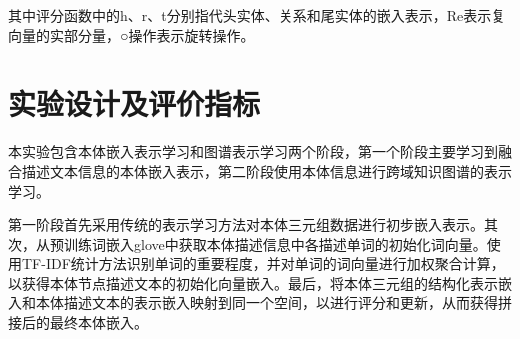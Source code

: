 
其中评分函数中的h、r、t分别指代头实体、关系和尾实体的嵌入表示，Re表示复向量的实部分量，○操作表示旋转操作。

\section{实验设计及评价指标}
本实验包含本体嵌入表示学习和图谱表示学习两个阶段，第一个阶段主要学习到融合描述文本信息的本体嵌入表示，第二阶段使用本体信息进行跨域知识图谱的表示学习。

第一阶段首先采用传统的表示学习方法对本体三元组数据进行初步嵌入表示。其次，从预训练词嵌入glove中获取本体描述信息中各描述单词的初始化词向量。使用TF-IDF统计方法识别单词的重要程度，并对单词的词向量进行加权聚合计算，以获得本体节点描述文本的初始化向量嵌入。最后，将本体三元组的结构化表示嵌入和本体描述文本的表示嵌入映射到同一个空间，以进行评分和更新，从而获得拼接后的最终本体嵌入。

